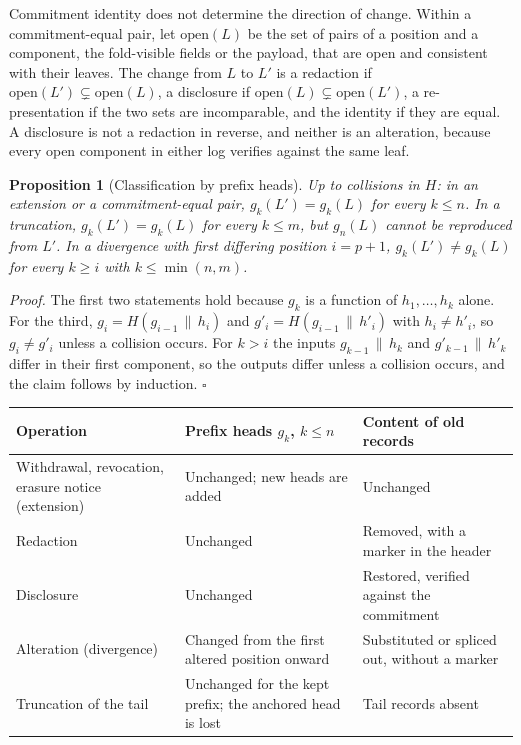 \documentclass[11pt]{article}
\theoremstyle{plain}
\newtheorem{proposition}{Proposition}
\theoremstyle{definition}
\theoremstyle{remark}
\begin{document}
Commitment identity does not determine the direction of change. Within a commitment-equal pair, let $\mathrm{open}(L)$ be the set of pairs of a position and a component, the fold-visible fields or the payload, that are open and consistent with their leaves. The change from $L$ to $L'$ is a redaction if $\mathrm{open}(L')\subsetneq\mathrm{open}(L)$, a disclosure if $\mathrm{open}(L)\subsetneq\mathrm{open}(L')$, a re-presentation if the two sets are incomparable, and the identity if they are equal. A disclosure is not a redaction in reverse, and neither is an alteration, because every open component in either log verifies against the same leaf.

\begin{proposition}[Classification by prefix heads]
Up to collisions in $H$: in an extension or a commitment-equal pair, $g_k(L')=g_k(L)$ for every $k\le n$. In a truncation, $g_k(L')=g_k(L)$ for every $k\le m$, but $g_n(L)$ cannot be reproduced from $L'$. In a divergence with first differing position $i=p+1$, $g_k(L')\neq g_k(L)$ for every $k\ge i$ with $k\le\min(n,m)$.
\end{proposition}
\emph{Proof.} The first two statements hold because $g_k$ is a function of $h_1,\dots,h_k$ alone. For the third, $g_i=H(g_{i-1}\,\|\,h_i)$ and $g'_i=H(g_{i-1}\,\|\,h'_i)$ with $h_i\neq h'_i$, so $g_i\neq g'_i$ unless a collision occurs. For $k>i$ the inputs $g_{k-1}\,\|\,h_k$ and $g'_{k-1}\,\|\,h'_k$ differ in their first component, so the outputs differ unless a collision occurs, and the claim follows by induction. \hfill$\square$

\begin{center}
\small
\begin{tabular}{|p{}|p{}|p{}|}
\hline
Operation & Prefix heads $g_k$, $k\le n$ & Content of old records \\
\hline
Withdrawal, revocation, erasure notice (extension) & Unchanged; new heads are added & Unchanged \\
\hline
Redaction & Unchanged & Removed, with a marker in the header \\
\hline
Disclosure & Unchanged & Restored, verified against the commitment \\
\hline
Alteration (divergence) & Changed from the first altered position onward & Substituted or spliced out, without a marker \\
\hline
Truncation of the tail & Unchanged for the kept prefix; the anchored head is lost & Tail records absent \\
\hline
\end{tabular}
\end{center}
\end{document}
